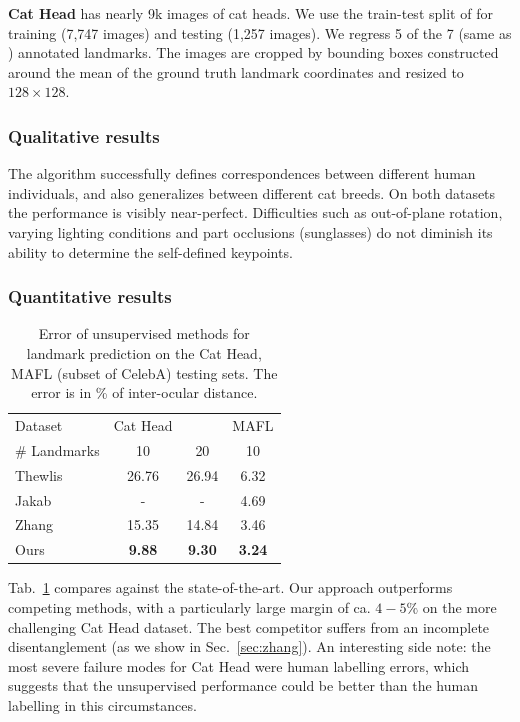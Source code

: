 			\begin{tcolorbox}
				\textbf{Cat Head} \cite{zhang08cathead}  has nearly 9k images of cat heads.
				We use the train-test split of \cite{zhang18} for training (7,747 images) and testing (1,257 images).
				We regress 5 of the 7 (same as \cite{zhang18}) annotated landmarks.
				The images are cropped by bounding boxes constructed around the mean of the ground truth landmark coordinates and resized to $128\times128$.
			\end{tcolorbox}

		\subsubsection{Qualitative results}
			The algorithm successfully defines correspondences between different human individuals, and also generalizes between different cat breeds.
			On both datasets the performance is visibly near-perfect.
			Difficulties such as out-of-plane rotation, varying lighting conditions and part occlusions (\eg sunglasses) do not diminish its ability to determine the self-defined keypoints.


		\subsubsection{Quantitative results}
			\begin{table}[t]
				\caption{Error of unsupervised methods for landmark prediction on the Cat Head, MAFL (subset of CelebA) testing sets. The error is in \% of inter-ocular distance.}
				\label{tab:faces}
				\centering
				\begin{tabular}{l|ccc}
				\hline
				Dataset & Cat Head &  & MAFL \\
				  \# Landmarks &10 & 20  & 10  \\
				  \hline
				 Thewlis \etal \cite{thewlis17}
				 & 26.76 & 26.94 & 6.32    \\
				 Jakab \etal \cite{jakab18}
				 & - & - & 4.69  \\
				 Zhang \etal \cite{zhang18}
				 & 15.35 & 14.84 & 3.46  \\
				  Ours & \textbf{9.88}  & \textbf{9.30} & \textbf{3.24}  \\ \hline  %
				\end{tabular}
			\end{table}
			Tab.~\ref{tab:faces} compares against the state-of-the-art.
			Our approach outperforms competing methods, with a particularly large margin of ca. $4-5\%$ on the more challenging Cat Head dataset. The best competitor suffers from an incomplete disentanglement (as we show in Sec.~\ref{sec:zhang}).
			An interesting side note: the most severe failure modes for Cat Head were human labelling errors, which suggests that the unsupervised performance could be better than the human labelling in this circumstances.

